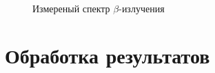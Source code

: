 \documentclass[14pt, a4paper]{report}
\begin{document}
\begin{enumerate}
\begin{figure}[H]
\centering
{}
\caption{Измереный спектр $\beta$-излучения}
\end{figure}

\end{enumerate}

\section{Обработка результатов}
\end{document}
